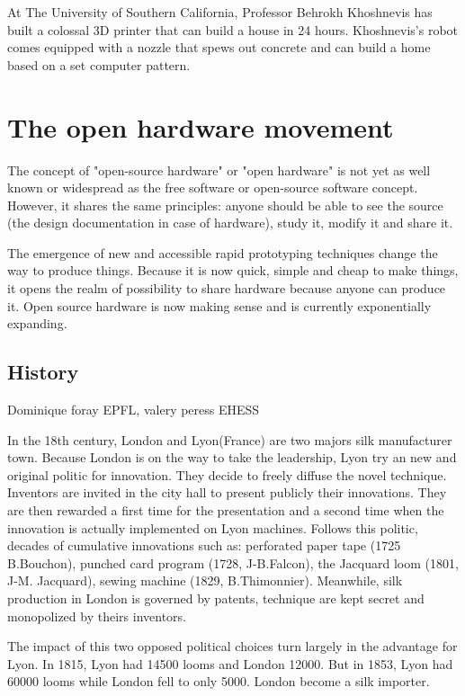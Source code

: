 At The University of Southern California, Professor Behrokh Khoshnevis has built a colossal 3D printer that can build a house in 24 hours. Khoshnevis's robot comes equipped with a nozzle that spews out concrete and can build a home based on a set computer pattern.



\section{The open hardware movement} %

The concept of "open-source hardware" or "open hardware" is not yet as well known or widespread as the free software or open-source software concept. However, it shares the same principles: anyone should be able to see the source (the design documentation in case of hardware), study it, modify it and share it.

The emergence of new and accessible rapid prototyping techniques change the way to produce things. Because it is now quick, simple and cheap to make things, it opens the realm of possibility to share hardware because anyone can produce it. Open source hardware is now making sense and is currently exponentially expanding.

\subsection{History} %

Dominique foray EPFL, valery peress EHESS

In the 18th century, London and Lyon(France) are two majors silk manufacturer town. Because London is on the way to take the leadership, Lyon try an new and original politic for innovation. They decide to freely diffuse the novel technique. Inventors are invited in the city hall to present publicly their innovations. They are then rewarded a first time for the presentation and a second time when the innovation is actually implemented on Lyon machines. Follows this politic, decades of cumulative innovations such as: perforated paper tape (1725 B.Bouchon), punched card program (1728, J-B.Falcon), the Jacquard loom (1801, J-M. Jacquard), sewing machine (1829, B.Thimonnier). Meanwhile, silk production in London is governed by patents, technique are kept secret and monopolized by theirs inventors. \cite{alain1997fate}

The impact of this two opposed political choices turn largely in the advantage for Lyon. In 1815, Lyon had 14500 looms and London 12000. But in 1853, Lyon had 60000 looms while London fell to only 5000. London become a silk importer.

